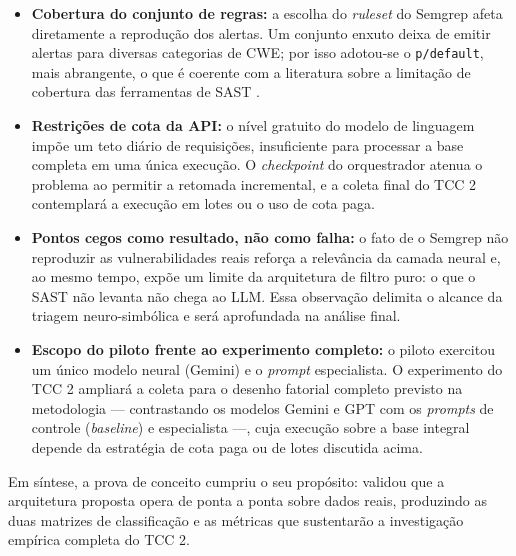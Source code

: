\begin{itemize}
    \item \textbf{Cobertura do conjunto de regras:} a escolha do \textit{ruleset} do Semgrep afeta diretamente a reprodução dos alertas. Um conjunto enxuto deixa de emitir alertas para diversas categorias de CWE; por isso adotou-se o \texttt{p/default}, mais abrangente, o que é coerente com a literatura sobre a limitação de cobertura das ferramentas de SAST \cite{bennett2024semgrep}.

    \item \textbf{Restrições de cota da API:} o nível gratuito do modelo de linguagem impõe um teto diário de requisições, insuficiente para processar a base completa em uma única execução. O \textit{checkpoint} do orquestrador atenua o problema ao permitir a retomada incremental, e a coleta final do TCC 2 contemplará a execução em lotes ou o uso de cota paga.

    \item \textbf{Pontos cegos como resultado, não como falha:} o fato de o Semgrep não reproduzir as vulnerabilidades reais reforça a relevância da camada neural e, ao mesmo tempo, expõe um limite da arquitetura de filtro puro: o que o SAST não levanta não chega ao LLM. Essa observação delimita o alcance da triagem neuro-simbólica e será aprofundada na análise final.

    \item \textbf{Escopo do piloto frente ao experimento completo:} o piloto exercitou um único modelo neural (Gemini) e o \textit{prompt} especialista. O experimento do TCC 2 ampliará a coleta para o desenho fatorial completo previsto na metodologia --- contrastando os modelos Gemini e GPT com os \textit{prompts} de controle (\textit{baseline}) e especialista ---, cuja execução sobre a base integral depende da estratégia de cota paga ou de lotes discutida acima.
\end{itemize}

Em síntese, a prova de conceito cumpriu o seu propósito: validou que a arquitetura proposta opera de ponta a ponta sobre dados reais, produzindo as duas matrizes de classificação e as métricas que sustentarão a investigação empírica completa do TCC 2.